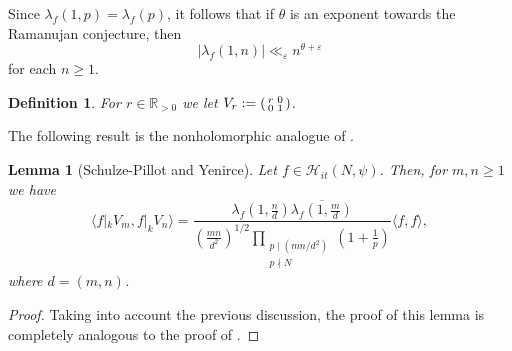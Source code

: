 \documentclass{article}
\newtheorem{lem}[thm]{Lemma}
\newtheorem{defi}[thm]{Definition}
\theoremstyle{named}
\newcommand{\HH}{\mathcal{H}}
\newcommand{\R}{\mathbb{R}}
\begin{document}
Since $\lambda_f(1, p) = \lambda_f(p)$, it follows that if $\theta$ is an exponent towards the Ramanujan conjecture, then
\begin{equation}\label{eq:ramanujanhecke1eigenvalues}
    |\lambda_f(1, n)| \ll_\varepsilon n^{\theta + \varepsilon}
\end{equation}
for each $n \geq 1$. 


\begin{defi}
For $r \in \R_{> 0}$ we let $V_r := \begin{psmallmatrix}
    r & 0\\
    0 & 1
\end{psmallmatrix}$.
\end{defi}
The following result is the nonholomorphic analogue of \cite[Theorem 2.7]{Schulze_Pillot_Petersson}.

\begin{lem}[Schulze-Pillot and Yenirce]\label{lem:innerproducdilations}
Let $f \in \HH_{it}(N, \psi)$. Then, for $m, n \geq 1$ we have 
\begin{equation}\label{eq:innerproductdilations}
    \langle f|_k V_m, f|_k V_n\rangle = \frac{\lambda_f\left(1, \frac{n}{d}\right)\overline{\lambda_f\left(1, \frac{m}{d}\right)}}{\left(\frac{mn}{d^2}\right)^{1/2}  \prod_{\substack{p \mid (mn/d^2)\\
    p \nmid N}}\left(1 + \frac{1}{p}\right)   } \langle f, f\rangle,
\end{equation}
where $d = (m, n)$. 
\end{lem}
\begin{proof}
Taking into account the previous discussion, the proof of this lemma is completely analogous to the proof of \cite[Theorem 2.7]{Schulze_Pillot_Petersson}. 
\end{proof}
\end{document}
